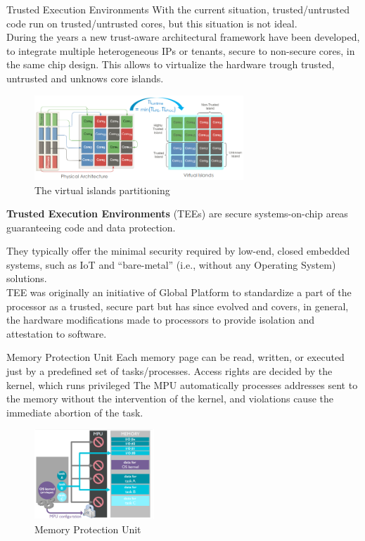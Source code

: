 \begin{section}{Trusted Execution Environments}
  With the current situation, trusted/untrusted code run on trusted/untrusted cores, but this
  situation is not ideal.\\
  During the years a new trust-aware architectural framework have been developed, to integrate
  multiple heterogeneous IPs or tenants, secure to non-secure cores, in the same chip design.
  This allows to virtualize the hardware trough trusted, untrusted and unknows core islands.

  \begin{figure}[H]
    \centering
    \includegraphics[width=0.7\textwidth]{img/hardware/virtual islands.png}
    \caption{The virtual islands partitioning}
  \end{figure}

  \begin{boxH}
    \textbf{Trusted Execution Environments} (TEEs) are secure systems-on-chip areas guaranteeing
    code and data protection.
  \end{boxH}
  They typically offer the minimal security required by low-end, closed embedded systems, such as
  IoT and “bare-metal” (i.e., without any Operating System) solutions.\\
  TEE was originally an initiative of Global Platform to standardize a part of the processor as a
  trusted, secure part but has since evolved and covers, in general, the hardware modifications made
  to processors to provide isolation and attestation to software.

\end{section}

\begin{section}{Memory Protection Unit}
  Each memory page can be read, written, or executed just by a predefined set of tasks/processes.
  Access rights are decided by the kernel, which runs privileged
  The MPU automatically processes addresses sent to the memory without the intervention of the
  kernel, and violations cause the immediate abortion of the task.
  \begin{figure}[H]
    \centering
    \includegraphics[width=0.4\textwidth]{img/hardware/memory protection unit.png}
    \caption{Memory Protection Unit}
  \end{figure}

\end{section}

